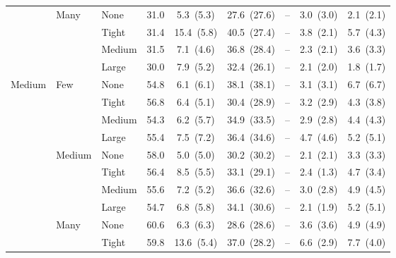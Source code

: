 \begin{table}[htbp]
{\begin{tabular}{lll c ccccc}
 & \multirow{4}{*}{\small Many} & {\small None} & 31.0 & 5.3~{\scriptsize(5.3)} & 27.6~{\scriptsize(27.6)} & -- & 3.0~{\scriptsize(3.0)} & 2.1~{\scriptsize(2.1)} \\
 &  & {\small Tight} & 31.4 & 15.4~{\scriptsize(5.8)} & 40.5~{\scriptsize(27.4)} & -- & 3.8~{\scriptsize(2.1)} & 5.7~{\scriptsize(4.3)} \\
 &  & {\small Medium} & 31.5 & 7.1~{\scriptsize(4.6)} & 36.8~{\scriptsize(28.4)} & -- & 2.3~{\scriptsize(2.1)} & 3.6~{\scriptsize(3.3)} \\
 &  & {\small Large} & 30.0 & 7.9~{\scriptsize(5.2)} & 32.4~{\scriptsize(26.1)} & -- & 2.1~{\scriptsize(2.0)} & 1.8~{\scriptsize(1.7)} \\
\midrule
\multirow{12}{*}{\small Medium} & \multirow{4}{*}{\small Few} & {\small None} & 54.8 & 6.1~{\scriptsize(6.1)} & 38.1~{\scriptsize(38.1)} & -- & 3.1~{\scriptsize(3.1)} & 6.7~{\scriptsize(6.7)} \\
 &  & {\small Tight} & 56.8 & 6.4~{\scriptsize(5.1)} & 30.4~{\scriptsize(28.9)} & -- & 3.2~{\scriptsize(2.9)} & 4.3~{\scriptsize(3.8)} \\
 &  & {\small Medium} & 54.3 & 6.2~{\scriptsize(5.7)} & 34.9~{\scriptsize(33.5)} & -- & 2.9~{\scriptsize(2.8)} & 4.4~{\scriptsize(4.3)} \\
 &  & {\small Large} & 55.4 & 7.5~{\scriptsize(7.2)} & 36.4~{\scriptsize(34.6)} & -- & 4.7~{\scriptsize(4.6)} & 5.2~{\scriptsize(5.1)} \\
 & \multirow{4}{*}{\small Medium} & {\small None} & 58.0 & 5.0~{\scriptsize(5.0)} & 30.2~{\scriptsize(30.2)} & -- & 2.1~{\scriptsize(2.1)} & 3.3~{\scriptsize(3.3)} \\
 &  & {\small Tight} & 56.4 & 8.5~{\scriptsize(5.5)} & 33.1~{\scriptsize(29.1)} & -- & 2.4~{\scriptsize(1.3)} & 4.7~{\scriptsize(3.4)} \\
 &  & {\small Medium} & 55.6 & 7.2~{\scriptsize(5.2)} & 36.6~{\scriptsize(32.6)} & -- & 3.0~{\scriptsize(2.8)} & 4.9~{\scriptsize(4.5)} \\
 &  & {\small Large} & 54.7 & 6.8~{\scriptsize(5.8)} & 34.1~{\scriptsize(30.6)} & -- & 2.1~{\scriptsize(1.9)} & 5.2~{\scriptsize(5.1)} \\
 & \multirow{4}{*}{\small Many} & {\small None} & 60.6 & 6.3~{\scriptsize(6.3)} & 28.6~{\scriptsize(28.6)} & -- & 3.6~{\scriptsize(3.6)} & 4.9~{\scriptsize(4.9)} \\
 &  & {\small Tight} & 59.8 & 13.6~{\scriptsize(5.4)} & 37.0~{\scriptsize(28.2)} & -- & 6.6~{\scriptsize(2.9)} & 7.7~{\scriptsize(4.0)} \\

\end{tabular}}
\end{table}
